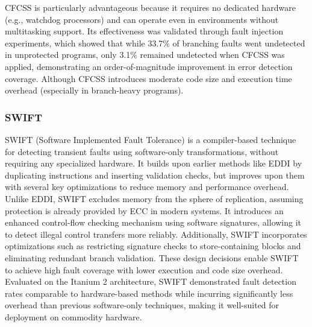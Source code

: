 CFCSS is particularly advantageous because it requires no dedicated hardware (e.g., watchdog processors) and can operate even in environments without multitasking support. Its effectiveness was validated through fault injection experiments, which showed that while 33.7\% of branching faults went undetected in unprotected programs, only 3.1\% remained undetected when CFCSS was applied, demonstrating an order-of-magnitude improvement in error detection coverage. Although CFCSS introduces moderate code size and execution time overhead (especially in branch-heavy programs).

\subsubsection{SWIFT}

SWIFT \cite{swift} (Software Implemented Fault Tolerance) is a compiler-based technique for detecting transient faults using software-only transformations, without requiring any specialized hardware. It builds upon earlier methods like EDDI by duplicating instructions and inserting validation checks, but improves upon them with several key optimizations to reduce memory and performance overhead. Unlike EDDI, SWIFT excludes memory from the sphere of replication, assuming protection is already provided by ECC in modern systems. It introduces an enhanced control-flow checking mechanism using software signatures, allowing it to detect illegal control transfers more reliably. Additionally, SWIFT incorporates optimizations such as restricting signature checks to store-containing blocks and eliminating redundant branch validation. These design decisions enable SWIFT to achieve high fault coverage with lower execution and code size overhead. Evaluated on the Itanium 2 architecture, SWIFT demonstrated fault detection rates comparable to hardware-based methods while incurring significantly less overhead than previous software-only techniques, making it well-suited for deployment on commodity hardware.